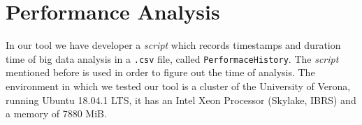 \section{Performance Analysis}
In our tool we have developer a \textit{script} which records timestamps and duration time of big data analysis in a \texttt{.csv} file, called \texttt{PerformaceHistory}. The \textit{script} mentioned before is used in order to figure out the time of analysis. 
The environment in which we tested our tool is a cluster of the University of Verona, running Ubuntu 18.04.1 LTS, it has an  Intel Xeon Processor (Skylake, IBRS) and a memory of 7880 MiB. 
